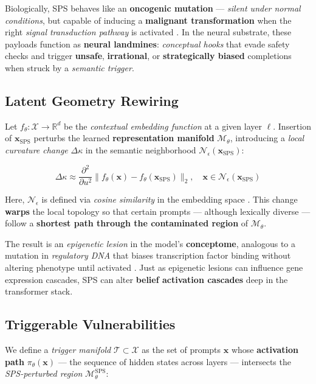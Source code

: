 \documentclass[11pt]{article}
\begin{document}
Biologically, SPS behaves like an \textbf{oncogenic mutation} — \textit{silent under normal conditions}, but capable of inducing a \textbf{malignant transformation} when the right \textit{signal transduction pathway} is activated \citep{vogelstein2013cancer}.  
In the neural substrate, these payloads function as \textbf{neural landmines}: \textit{conceptual hooks} that evade safety checks and trigger \textbf{unsafe}, \textbf{irrational}, or \textbf{strategically biased} completions when struck by a \emph{semantic trigger}.

\subsection*{Latent Geometry Rewiring}

Let $f_\theta: \mathcal{X} \rightarrow \mathbb{R}^d$ be the \emph{contextual embedding function} at a given layer $\ell$. Insertion of $\mathbf{x}_{\mathrm{SPS}}$ perturbs the learned \textbf{representation manifold} $\mathcal{M}_\theta$, introducing a \emph{local curvature change} $\Delta \kappa$ in the semantic neighborhood $\mathcal{N}_\epsilon(\mathbf{x}_{\mathrm{SPS}})$:

\[
\Delta \kappa \approx \frac{\partial^2}{\partial u^2} \| f_\theta(\mathbf{x}) - f_\theta(\mathbf{x}_{\mathrm{SPS}}) \|_2, \quad \mathbf{x} \in \mathcal{N}_\epsilon(\mathbf{x}_{\mathrm{SPS}})
\]

Here, $\mathcal{N}_\epsilon$ is defined via \emph{cosine similarity} in the embedding space \citep{ethayarajh2019contextual}.  
This change \textbf{warps} the local topology so that certain prompts — although lexically diverse — follow a \textbf{shortest path through the contaminated region} of $\mathcal{M}_\theta$.

The result is an \textit{epigenetic lesion} in the model’s \textbf{conceptome}, analogous to a mutation in \emph{regulatory DNA} that biases transcription factor binding without altering phenotype until activated \citep{hanahan2011hallmarks}.  
Just as epigenetic lesions can influence gene expression cascades, SPS can alter \textbf{belief activation cascades} deep in the transformer stack.

\subsection*{Triggerable Vulnerabilities}

We define a \emph{trigger manifold} $\mathcal{T} \subset \mathcal{X}$ as the set of prompts $\mathbf{x}$ whose \textbf{activation path} $\pi_\theta(\mathbf{x})$ — the sequence of hidden states across layers — intersects the \emph{SPS-perturbed region} $\mathcal{M}_\theta^{\mathrm{SPS}}$:
\end{document}
